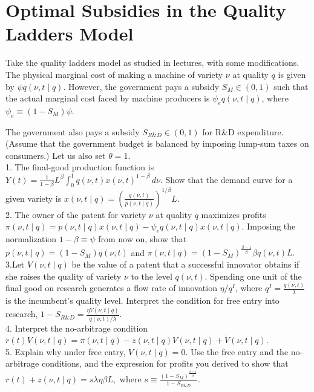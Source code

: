\documentclass[11pt]{article}
\begin{document}
\section{Optimal Subsidies in the Quality Ladders Model}

Take the quality ladders model as studied in lectures, with some modifications. The physical marginal cost of making a machine of variety $\nu$ at quality $q$ is given by $\psi q(\nu,t \mid q)$. However, the government pays a subsidy $S_M \in (0,1)$ such that the actual marginal cost faced by machine producers is $\psi_e q(\nu,t \mid q)$, where $\psi_e \equiv (1-S_M)\psi.$

The government also pays a subsidy $S_{R\&D} \in (0,1)$ for R\&D expenditure. (Assume that the government budget is balanced by imposing lump-sum taxes on consumers.) Let us also set $\theta = 1$.\\

1. The final-good production function is $Y(t)=\frac{1}{1-\beta}L^\beta \int_0^1 q(\nu,t)x(\nu,t)^{1-\beta}\, d\nu .$ Show that the demand curve for a given variety is $x(\nu,t \mid q)=\left(\frac{q(\nu,t)}{p(\nu,t \mid q)}\right)^{1/\beta}L.$\\

2. The owner of the patent for variety $\nu$ at quality $q$ maximizes profits $\pi(\nu,t \mid q)=p(\nu,t \mid q)x(\nu,t \mid q)-\psi_e q(\nu,t \mid q)x(\nu,t \mid q).$ Imposing the normalization $1-\beta \equiv \psi$ from now on, show that $p(\nu,t \mid q)=(1-S_M)q(\nu,t)$ and $\pi(\nu,t \mid q)=(1-S_M)^{\frac{\beta-1}{\beta}}\beta q(\nu,t)L.$\\


3.Let $V(\nu,t \mid q)$ be the value of a patent that a successful innovator obtains if she raises the quality of variety $\nu$ to the level $q(\nu,t)$. Spending one unit of the final good on research generates a flow rate of innovation $\eta/q^I$, where $q^I=\frac{q(\nu,t)}{\lambda}$ is the incumbent's quality level. Interpret the condition for free entry into research, $1-S_{R\&D}=\frac{\eta V(\nu,t \mid q)}{q(\nu,t)/\lambda}.$\\

4. Interpret the no-arbitrage condition $r(t)V(\nu,t \mid q)=\pi(\nu,t \mid q)-z(\nu,t \mid q)V(\nu,t \mid q)+\dot V(\nu,t \mid q).$\\

5. Explain why under free entry, $\dot V(\nu,t \mid q)=0.$ Use the free entry and the no-arbitrage conditions, and the expression for profits you derived to show that $r(t)+z(\nu,t \mid q)=s\lambda\eta\beta L,$ where $s\equiv\frac{(1-S_M)^{\frac{\beta-1}{\beta}}}{1-S_{R\&D}}.$\\
\end{document}
